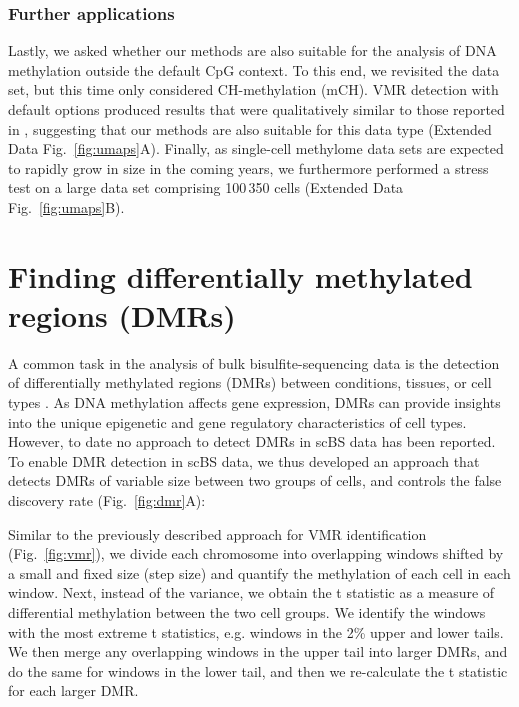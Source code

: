 \documentclass[10pt]{article}
\begin{document}
\subsubsection*{Further applications}

Lastly, we asked whether our methods are also suitable for the analysis of DNA methylation outside the default CpG context.
To this end, we revisited the \citet{luo2017single} data set, but this time only considered CH-methylation (mCH).
VMR detection with default options produced results that were qualitatively similar to those reported in \citet{luo2017single}, suggesting that our methods are also suitable for this data type (Extended Data Fig.~\ref{fig:umaps}A).
Finally, as single-cell methylome data sets are expected to rapidly grow in size in the coming years, we furthermore performed a stress test on a large data set comprising 100\,350 cells \citep{liu2021dna} (Extended Data Fig.~\ref{fig:umaps}B).




\section*{Finding differentially methylated regions (DMRs)}

A common task in the analysis of bulk bisulfite-sequencing data is the detection of differentially methylated regions (DMRs) between conditions, tissues, or cell types \citep{Hebestreit2013, dmrseq}.
As DNA methylation affects gene expression, DMRs can provide insights into the unique epigenetic and gene regulatory characteristics of cell types.
However, to date no approach to detect DMRs in scBS data has been reported.
To enable DMR detection in scBS data, we thus developed an approach that detects DMRs of variable size between two groups of cells, and controls the false discovery rate (Fig.~\ref{fig:dmr}A):

Similar to the previously described approach for VMR identification (Fig.~\ref{fig:vmr}), we divide each chromosome into overlapping windows shifted by a small and fixed size (step size) and quantify the methylation of each cell in each window.
Next, instead of the variance, we obtain the t statistic as a measure of differential methylation between the two cell groups.
We identify the windows with the most extreme t statistics, e.g. windows in the 2\% upper and lower tails.
We then merge any overlapping windows in the upper tail into larger DMRs, and do the same for windows in the lower tail, and then we re-calculate the t statistic for each larger DMR.
\end{document}
